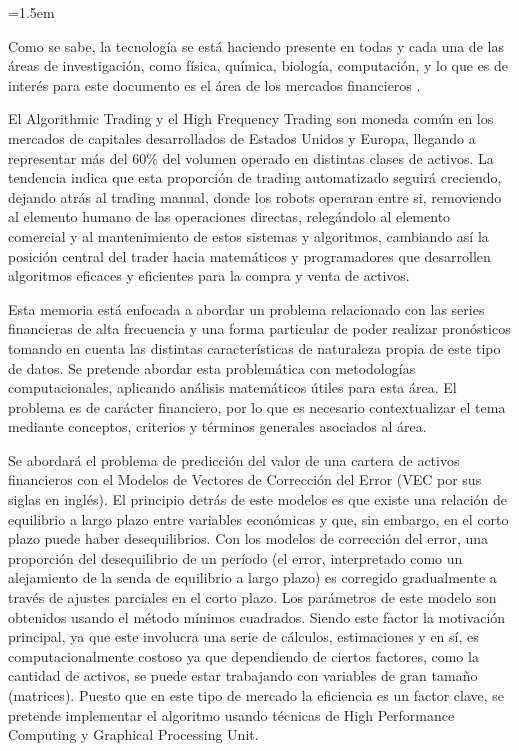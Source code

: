 \parindent=1.5em

Como se sabe, la tecnología se está haciendo presente en todas y cada una de
las áreas de investigación, como física, química, biología, computación, y lo
que es de interés para este documento es el área de los mercados financieros
\cite{watsham1997quantitative}.

El Algorithmic Trading y el High Frequency Trading son moneda común en los
mercados de capitales desarrollados de Estados Unidos y Europa, llegando a
representar más del 60\% del volumen operado en distintas clases de activos. La
tendencia indica que esta proporción de trading automatizado seguirá creciendo,
dejando atrás al trading manual, donde los robots operaran entre si, removiendo
al elemento humano de las operaciones directas, relegándolo al elemento
comercial y al mantenimiento de estos sistemas y algoritmos, cambiando así la
posición central del trader hacia matemáticos y programadores que desarrollen
algoritmos eficaces y eficientes para la compra y venta de activos.

Esta memoria está enfocada a abordar un problema relacionado con las series
financieras de alta frecuencia y una forma particular de poder realizar
pronósticos tomando en cuenta las distintas características de naturaleza
propia de este tipo de datos. Se pretende abordar esta problemática con
metodologías computacionales, aplicando análisis matemáticos útiles para esta
área. El problema es de carácter financiero, por lo que es necesario
contextualizar el tema mediante conceptos, criterios y términos generales
asociados al área.

Se abordará el problema de predicción del valor de una cartera de activos
financieros con el Modelos de Vectores de Corrección del Error (VEC por sus
siglas en inglés). El principio detrás de este modelos es que existe una
relación de equilibrio a largo plazo entre variables económicas y que, sin
embargo, en el corto plazo puede haber desequilibrios. Con los modelos de
corrección del error, una proporción del desequilibrio de un período (el error,
interpretado como un alejamiento de la senda de equilibrio a largo plazo) es
corregido gradualmente a través de ajustes parciales en el corto plazo.  Los
parámetros de este modelo son obtenidos usando el método mínimos cuadrados.
Siendo este factor la motivación principal, ya que este involucra una serie de
cálculos, estimaciones y en sí, es computacionalmente costoso ya que
dependiendo de ciertos factores, como la cantidad de activos, se puede estar
trabajando con variables de gran tamaño (matrices). Puesto que en este tipo de
mercado la eficiencia es un factor clave, se pretende implementar el algoritmo
usando técnicas de High Performance Computing y Graphical Processing Unit.

